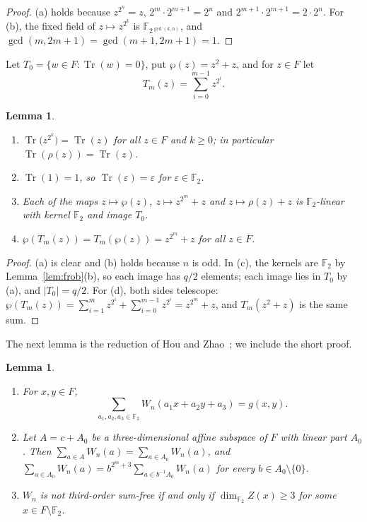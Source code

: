 \documentclass[11pt,a4paper,reqno]{amsart}
\newtheorem{lemma}[theorem]{Lemma}
\theoremstyle{remark}
\numberwithin{equation}{section}
\newcommand{\F}{\mathbb{F}}
\newcommand{\Tr}{\operatorname{Tr}}
\begin{document}
\begin{proof}
(a) holds because $z^{2^n}=z$, $2^m\cdot2^{m+1}=2^n$ and $2^{m+1}\cdot2^{m+1}=2\cdot2^n$. For (b), the fixed field of $z\mapsto z^{2^k}$ is $\F_{2^{\gcd(k,n)}}$, and $\gcd(m,2m+1)=\gcd(m+1,2m+1)=1$.
\end{proof}

Let $T_0=\{w\in F:\Tr(w)=0\}$, put $\wp(z)=z^2+z$, and for $z\in F$ let
\[
T_m(z)=\sum_{i=0}^{m-1}z^{2^i}.
\]

\begin{lemma}\label{lem:trace}
\begin{enumerate}
\item[(a)] $\Tr\bigl(z^{2^k}\bigr)=\Tr(z)$ for all $z\in F$ and $k\ge0$; in particular $\Tr(\rho(z))=\Tr(z)$.
\item[(b)] $\Tr(1)=1$, so $\Tr(\varepsilon)=\varepsilon$ for $\varepsilon\in\F_2$.
\item[(c)] Each of the maps $z\mapsto\wp(z)$, $z\mapsto z^{2^m}+z$ and $z\mapsto\rho(z)+z$ is $\F_2$-linear with kernel $\F_2$ and image $T_0$.
\item[(d)] $\wp(T_m(z))=T_m(\wp(z))=z^{2^m}+z$ for all $z\in F$.
\end{enumerate}
\end{lemma}

\begin{proof}
(a) is clear and (b) holds because $n$ is odd. In (c), the kernels are $\F_2$ by Lemma~\ref{lem:frob}(b), so each image has $q/2$ elements; each image lies in $T_0$ by (a), and $|T_0|=q/2$. For (d), both sides telescope: $\wp(T_m(z))=\sum_{i=1}^{m}z^{2^i}+\sum_{i=0}^{m-1}z^{2^i}=z^{2^m}+z$, and $T_m(z^2+z)$ is the same sum.
\end{proof}

The next lemma is the reduction of Hou and Zhao~\cite[Section~5.3]{HZ}; we include the short proof.

\begin{lemma}\label{lem:reduction}
\begin{enumerate}
\item[(a)] For $x,y\in F$,
\[
\sum_{a_1,a_2,a_3\in\F_2}W_n(a_1x+a_2y+a_3)=g(x,y).
\]
\item[(b)] Let $A=c+A_0$ be a three-dimensional affine subspace of $F$ with linear part $A_0$. Then $\sum_{a\in A}W_n(a)=\sum_{a\in A_0}W_n(a)$, and $\sum_{a\in A_0}W_n(a)=b^{2^m+3}\sum_{a\in b^{-1}A_0}W_n(a)$ for every $b\in A_0\setminus\{0\}$.
\item[(c)] $W_n$ is not third-order sum-free if and only if $\dim_{\F_2}Z(x)\ge3$ for some $x\in F\setminus\F_2$.
\end{enumerate}
\end{lemma}
\end{document}

